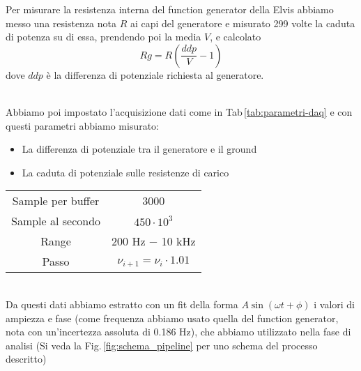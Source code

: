 \documentclass[../Relazione_circuiti]{subfiles}
\begin{document}
  Per misurare la resistenza interna del function generator della Elvis abbiamo messo una resistenza nota $R$ ai capi
  del generatore e misurato 299 volte la caduta di potenza su di essa, prendendo poi la media $V$, e calcolato
  \begin{equation*}
    Rg = R \left( \frac{ddp}{V} - 1 \right)
  \end{equation*}
  dove $ddp$ è la differenza di potenziale richiesta al generatore. \\ \\
  \begin{minipage}{0.49\textwidth}
    \setlength{\parindent}{20pt}
    Abbiamo poi impostato l'acquisizione dati come in Tab\,\ref{tab:parametri-daq} e con questi parametri abbiamo
    misurato:
    \begin{itemize}
      \item La differenza di potenziale tra il generatore e il ground
      \item La caduta di potenziale sulle resistenze di carico
    \end{itemize}

  \end{minipage} \hfill
  \begin{minipage}{0.49\textwidth}

    \centering
    \begin{minipage}{0.85\textwidth}
      \centering
      \begin{tabular}{|c|c|}
        \hline
        Sample per buffer & 3000                           \\
        Sample al secondo & $ 450 \cdot 10^3 $             \\
        Range             & 200 Hz − 10 kHz                \\
        Passo             & $\nu_{i+1} = \nu_i \cdot 1.01$ \\ \hline
      \end{tabular}

      \label{tab:parametri-daq}
    \end{minipage}

  \end{minipage} \\

  Da questi dati abbiamo estratto con un fit della forma $ A \sin\left( \omega t + \phi \right) $ i valori di ampiezza e
  fase (come frequenza abbiamo usato quella del function generator, nota con un'incertezza assoluta di 0.186 Hz), che
  abbiamo utilizzato nella fase di analisi (Si veda la Fig.\,\ref{fig:schema_pipeline} per uno schema del processo
  descritto)
\end{document}

